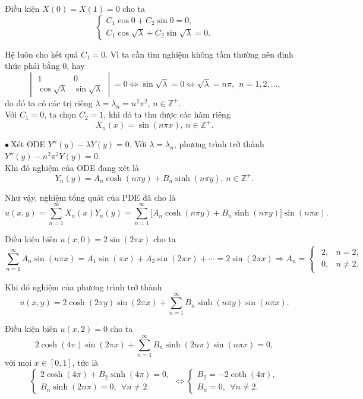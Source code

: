 \documentclass[10pt, a4paper]{article}
\begin{document}
	Điều kiện $X(0)=X(1)=0$ cho ta $$\begin{cases}
		C_1\cos0+C_2\sin0=0,\\
		C_1\cos\sqrt\lambda+C_2\sin\sqrt\lambda=0.
	\end{cases}$$
	
	Hệ luôn cho kết quả $C_1=0$. Vì ta cần tìm nghiệm không tầm thường nên định thức phải bằng 0, hay $$\begin{vmatrix}
		1&0\\
		\cos\sqrt\lambda&\sin\sqrt\lambda
	\end{vmatrix}=0\iff\sin\sqrt\lambda=0\iff\sqrt\lambda=n\pi,~~n=1,2,\ldots,$$
	do đó ta có các trị riêng $\lambda=\lambda_n=n^2\pi^2,\,n\in\mathbb Z^+$.\\
	
	Với $C_1=0$, ta chọn $C_2=1$, khi đó ta thu được các hàm riêng $$X_n(x)=\sin(n\pi x),\,n\in\mathbb Z^+.$$
	
	$\bullet~$Xét ODE $Y''(y)-\lambda Y(y)=0$. Với $\lambda=\lambda_n$, phương trình trở thành $Y''(y)-n^2\pi^2Y(y)=0$.\\
	
	Khi đó nghiệm của ODE đang xét là $$Y_n(y)=A_n\cosh(n\pi y)+B_n\sinh(n\pi y),\,n\in\mathbb Z^+.$$
	
	Như vậy, nghiệm tổng quát của PDE đã cho là $$u(x,y)=\sum_{n=1}^\infty X_n(x)Y_n(y)=\sum_{n=1}^\infty\big[A_n\cosh(n\pi y)+B_n\sinh(n\pi y)\big]\sin(n\pi x).$$
	
	Điều kiện biên $u(x,0)=2\sin(2\pi x)$ cho ta $$\sum_{n=1}^\infty A_n\sin(n\pi x)=A_1\sin(\pi x)+A_2\sin(2\pi x)+\cdots=2\sin(2\pi x)\Rightarrow A_n=\begin{cases}
		\begin{array}{ll}
			2, & n=2, \\
			0, & n\ne2.
		\end{array}
	\end{cases}$$
	
	Khi đó nghiệm của phương trình trở thành $$u(x,y)=2\cosh(2\pi y)\sin(2\pi x)+\sum_{n=1}^\infty B_n\sinh(n\pi y)\sin(n\pi x).$$
	
	Điều kiện biên $u(x,2)=0$ cho ta $$2\cosh(4\pi)\sin(2\pi x)+\sum_{n=1}^\infty B_n\sinh(2n\pi)\sin(n\pi x)=0,$$
	với mọi $x\in[0,1]$, tức là $$\begin{cases}
		2\cosh(4\pi)+B_2\sinh(4\pi)=0,\\
		B_n\sinh(2n\pi)=0,~~\forall n\ne2
	\end{cases}\iff\begin{cases}
		B_2=-2\coth(4\pi),\\
		B_n=0,~~\forall n\ne2.
	\end{cases}$$
	
\end{document}
